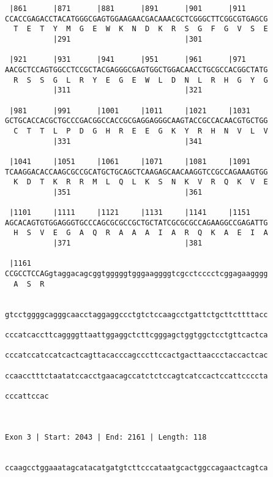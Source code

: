 \documentclass{article}
\begin{document}
\begin{Verbatim}
 |861      |871      |881      |891      |901      |911     
CCACCGAGACCTACATGGGCGAGTGGAAGAACGACAAACGCTCGGGCTTCGGCGTGAGCG
  T  E  T  Y  M  G  E  W  K  N  D  K  R  S  G  F  G  V  S  E
           |291                          |301               
  
 |921      |931      |941      |951      |961      |971     
AACGCTCCAGTGGCCTCCGCTACGAGGGCGAGTGGCTGGACAACCTGCGCCACGGCTATG
  R  S  S  G  L  R  Y  E  G  E  W  L  D  N  L  R  H  G  Y  G
           |311                          |321               
  
 |981      |991      |1001     |1011     |1021     |1031    
GCTGCACCACGCTGCCCGACGGCCACCGCGAGGAGGGCAAGTACCGCCACAACGTGCTGG
  C  T  T  L  P  D  G  H  R  E  E  G  K  Y  R  H  N  V  L  V
           |331                          |341               
  
 |1041     |1051     |1061     |1071     |1081     |1091    
TCAAGGACACCAAGCGCCGCATGCTGCAGCTCAAGAGCAACAAGGTCCGCCAGAAAGTGG
  K  D  T  K  R  R  M  L  Q  L  K  S  N  K  V  R  Q  K  V  E
           |351                          |361               
  
 |1101     |1111     |1121     |1131     |1141     |1151    
AGCACAGTGTGGAGGGTGCCCAGCGCGCCGCTGCTATCGCGCGCCAGAAGGCCGAGATTG
  H  S  V  E  G  A  Q  R  A  A  A  I  A  R  Q  K  A  E  I  A
           |371                          |381               
  
 |1161                                                      
CCGCCTCCAGgtaggacagcggtgggggtgggaaggggtcgcctcccctcggagaagggg
  A  S  R                                                   
                                                            
  
gtcctggggcagggcaacctaggaggccctgtctccaagcctgattctgcttcttttacc
                                                            
cccatcaccttcaggggttaattggaggctcttcgggagctggtggctcctgttcactca
                                                            
cccatccatccatcactcagttacacccagcccttccactgacttaaccctaccactcac
                                                            
ccaacctttctaatatccacctgaacagccatctctccagtcatccactccattccccta
                                                            
cccattccac
          
          
 
Exon 3 | Start: 2043 | End: 2161 | Length: 118


ccaagcctggaaatagcatacatgatgtcttcccataatgcactggccagaactcagtca
                                                            

\end{Verbatim}
\end{document}

